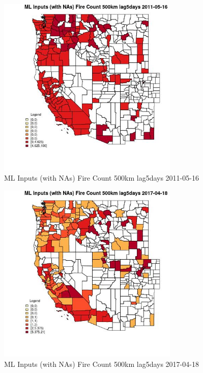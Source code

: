 \begin{figure} 
\centering  
\includegraphics[width=0.77\textwidth]{Code_Outputs/Report_ML_input_PM25_Step4_part_e_de_duplicated_aves_compiled_2019-05-20wNAs_CountyFire_Count_500km_lag5daysMean2011-05-16.jpg} 
\caption{\label{fig:Report_ML_input_PM25_Step4_part_e_de_duplicated_aves_compiled_2019-05-20wNAsCountyFire_Count_500km_lag5daysMean2011-05-16}ML Inputs (with NAs) Fire Count 500km lag5days 2011-05-16} 
\end{figure} 
 

\begin{figure} 
\centering  
\includegraphics[width=0.77\textwidth]{Code_Outputs/Report_ML_input_PM25_Step4_part_e_de_duplicated_aves_compiled_2019-05-20wNAs_CountyFire_Count_500km_lag5daysMean2017-04-18.jpg} 
\caption{\label{fig:Report_ML_input_PM25_Step4_part_e_de_duplicated_aves_compiled_2019-05-20wNAsCountyFire_Count_500km_lag5daysMean2017-04-18}ML Inputs (with NAs) Fire Count 500km lag5days 2017-04-18} 
\end{figure} 
 

